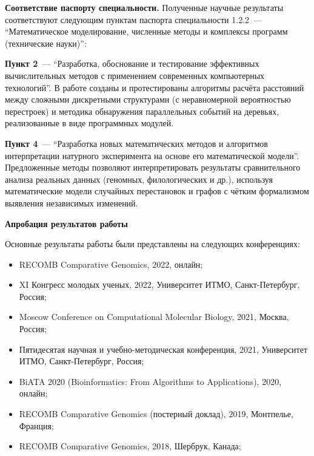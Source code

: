\textbf{Соответствие паспорту специальности.}
Полученные научные результаты соответствуют следующим пунктам паспорта специальности 1.2.2~--- ``Математическое моделирование, численные методы и комплексы программ (технические науки)'':

 \textbf{Пункт 2}~--- ``Разработка, обоснование и тестирование эффективных вычислительных методов с применением современных компьютерных технологий''.
В работе созданы и протестированы алгоритмы расчёта расстояний между сложными дискретными структурами (с неравномерной вероятностью перестроек) и методика обнаружения параллельных событий на деревьях, реализованные в виде программных модулей.

\textbf{Пункт 4}~--- ``Разработка новых математических методов и алгоритмов интерпретации натурного эксперимента на основе его математической модели''.  
Предложенные методы позволяют интерпретировать результаты сравнительного анализа реальных данных (геномных, филологических и др.), используя математические модели случайных перестановок и графов с чётким формализмом выявления независимых изменений.

\textbf{Апробация результатов работы}

Основные результаты работы были представлены на следующих  конференциях:

\begin{itemize}
    \item RECOMB Comparative Genomics, 2022, онлайн;
    \item XI Конгресс молодых ученых, 2022, Университет ИТМО, Санкт-Петербург, Россия;
    \item Moscow Conference on Computational Molecular Biology, 2021, Москва, Россия;
    \item Пятидесятая научная и учебно-методическая конференция, 2021, Университет ИТМО, Санкт-Петербург, Россия;
    \item BiATA 2020 (Bioinformatics: From Algorithms to Applications), 2020, онлайн;
    \item RECOMB Comparative Genomics (постерный доклад), 2019, Монтпелье, Франция;
    \item RECOMB Comparative Genomics, 2018, Шербрук, Канада;
\end{itemize}